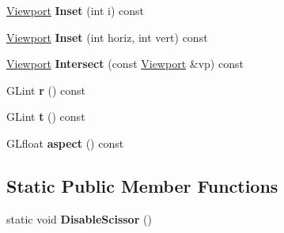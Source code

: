 \begin{DoxyCompactItemize}
\item 
\hyperlink{structpangolin_1_1_viewport}{Viewport} {\bfseries Inset} (int i) const \hypertarget{structpangolin_1_1_viewport_ad018b7516ac7b15fa18e2dac548b7ec2}{}\label{structpangolin_1_1_viewport_ad018b7516ac7b15fa18e2dac548b7ec2}

\item 
\hyperlink{structpangolin_1_1_viewport}{Viewport} {\bfseries Inset} (int horiz, int vert) const \hypertarget{structpangolin_1_1_viewport_a1ceb1f9b607860763235c76c8ac95039}{}\label{structpangolin_1_1_viewport_a1ceb1f9b607860763235c76c8ac95039}

\item 
\hyperlink{structpangolin_1_1_viewport}{Viewport} {\bfseries Intersect} (const \hyperlink{structpangolin_1_1_viewport}{Viewport} \&vp) const \hypertarget{structpangolin_1_1_viewport_aeba41464220296b0d18b4c7ba0199c51}{}\label{structpangolin_1_1_viewport_aeba41464220296b0d18b4c7ba0199c51}

\item 
G\+Lint {\bfseries r} () const \hypertarget{structpangolin_1_1_viewport_a13e1a33e33483ee32fd2eaec67f985c7}{}\label{structpangolin_1_1_viewport_a13e1a33e33483ee32fd2eaec67f985c7}

\item 
G\+Lint {\bfseries t} () const \hypertarget{structpangolin_1_1_viewport_a580bc6ed2e4c95092c66ead45f384d92}{}\label{structpangolin_1_1_viewport_a580bc6ed2e4c95092c66ead45f384d92}

\item 
G\+Lfloat {\bfseries aspect} () const \hypertarget{structpangolin_1_1_viewport_af29133ab221202f66860311c1b42c560}{}\label{structpangolin_1_1_viewport_af29133ab221202f66860311c1b42c560}

\end{DoxyCompactItemize}
\subsection*{Static Public Member Functions}
\begin{DoxyCompactItemize}
\item 
static void {\bfseries Disable\+Scissor} ()\hypertarget{structpangolin_1_1_viewport_a3ff1d808ec43332af2e5267938688536}{}\label{structpangolin_1_1_viewport_a3ff1d808ec43332af2e5267938688536}

\end{DoxyCompactItemize}
